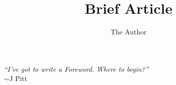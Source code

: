 \documentclass[fleqn]{article} %
\title{Brief Article}
\author{The Author}
\begin{document}

\setcounter{page}{2}

\newpage{}
\thispagestyle{empty}

\vspace*{100pt}
\begin{flushright}
	\textit{``I've got to write a Foreword. Where to begin?''}
    \\$\sim$J Pitt 
\end{flushright}

\newpage{}


\tableofcontents


















\end{document}
